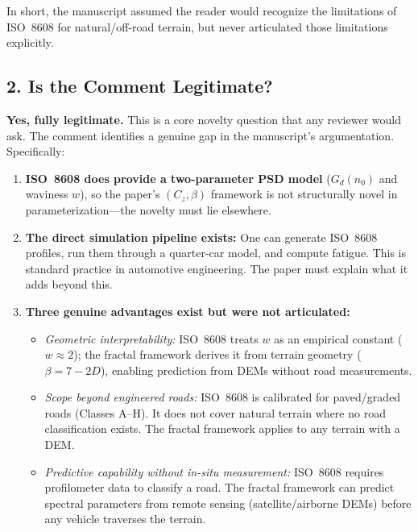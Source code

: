 \documentclass[11pt]{article}
\begin{document}
In short, the manuscript assumed the reader would recognize the limitations of ISO~8608 for natural/off-road terrain, but never articulated those limitations explicitly.

\subsection*{2. Is the Comment Legitimate?}

\textbf{Yes, fully legitimate.} This is a core novelty question that any reviewer would ask. The comment identifies a genuine gap in the manuscript's argumentation. Specifically:

\begin{enumerate}
    \item \textbf{ISO~8608 does provide a two-parameter PSD model} ($G_d(n_0)$ and waviness $w$), so the paper's $(C_z, \beta)$ framework is not structurally novel in parameterization---the novelty must lie elsewhere.
    
    \item \textbf{The direct simulation pipeline exists:} One can generate ISO~8608 profiles, run them through a quarter-car model, and compute fatigue. This is standard practice in automotive engineering. The paper must explain what it adds beyond this.
    
    \item \textbf{Three genuine advantages exist but were not articulated:}
    \begin{itemize}
        \item[(a)] \emph{Geometric interpretability:} ISO~8608 treats $w$ as an empirical constant ($w \approx 2$); the fractal framework derives it from terrain geometry ($\beta = 7-2D$), enabling prediction from DEMs without road measurements.
        \item[(b)] \emph{Scope beyond engineered roads:} ISO~8608 is calibrated for paved/graded roads (Classes A--H). It does not cover natural terrain where no road classification exists. The fractal framework applies to any terrain with a DEM.
        \item[(c)] \emph{Predictive capability without in-situ measurement:} ISO~8608 requires profilometer data to classify a road. The fractal framework can predict spectral parameters from remote sensing (satellite/airborne DEMs) before any vehicle traverses the terrain.
    \end{itemize}
\end{enumerate}
\end{document}
